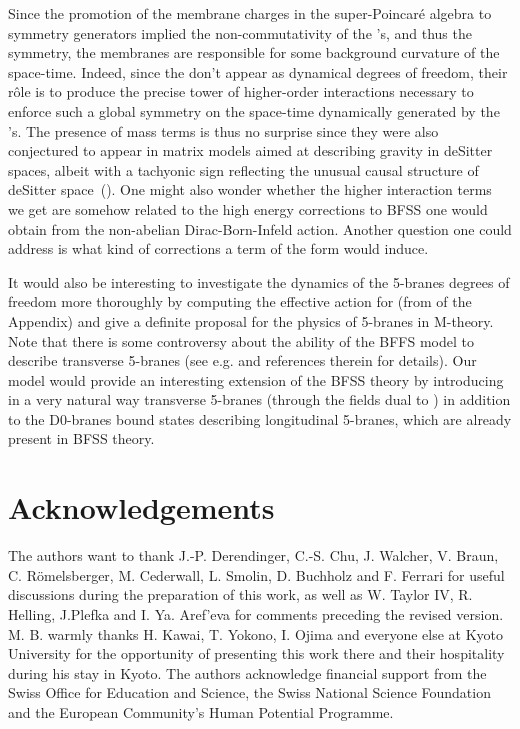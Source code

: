 \documentclass[a4paper,11pt]{article}
\begin{document}
Since the promotion of the membrane charges in the \coordHE{} super-Poincar\'e algebra to symmetry generators
implied the non-commutativity of the \coordHE{}'s, and thus the \coordHE{} symmetry, the membranes are responsible for
some background curvature of the space-time. Indeed, since the \coordHE{} don't appear as dynamical degrees of freedom, 
their r\^ole is to produce the precise tower of higher-order interactions necessary to enforce such a global symmetry
on the space-time dynamically generated by the \coordHE{}'s.
The presence of mass terms is thus no surprise since they were also conjectured to appear in matrix models aimed 
at describing gravity in deSitter spaces, albeit with a tachyonic sign reflecting the unusual causal structure of 
deSitter space~(\cite{Gao,Cham}).
One might also wonder whether the higher interaction terms we get are somehow related to the high energy corrections 
to BFSS one would obtain from the non-abelian Dirac-Born-Infeld action. Another question one could address is 
what kind of corrections a term of the form \coordHE{} would 
induce.

It would also be interesting to investigate the dynamics of the 5-branes degrees of freedom more thoroughly by computing
the effective action for \coordHE{} (from \coordHE{} of the Appendix) and give a definite proposal for the physics of 
5-branes in M-theory. Note that there is some controversy about the ability of the BFFS model to describe transverse 
5-branes (see e.g. \cite{GRWati,BSS} and references therein for details). Our model would provide an interesting 
extension of the BFSS theory by introducing in a very natural way transverse 5-branes (through the fields dual to 
\coordHE{}) in addition to the D0-branes bound states describing longitudinal 5-branes, which are already present 
in BFSS theory. 

\section{Acknowledgements}
The authors want to thank J.-P. Derendinger, C.-S. Chu, J. Walcher, V. Braun, C. R\"omelsberger, M. Cederwall, 
L. Smolin, D. Buchholz and F. Ferrari for useful discussions during the preparation of this work, as well as
W. Taylor IV, R. Helling, J.Plefka and I. Ya. Aref'eva for comments preceding the revised version. M. B. warmly 
thanks H. Kawai, T. Yokono, I. Ojima and everyone else at Kyoto University for the opportunity of presenting 
this work there and their hospitality during his stay in Kyoto. The authors acknowledge financial support from the Swiss Office 
for Education and Science, the Swiss National Science Foundation and the European Community's Human Potential
Programme.
\end{document}
